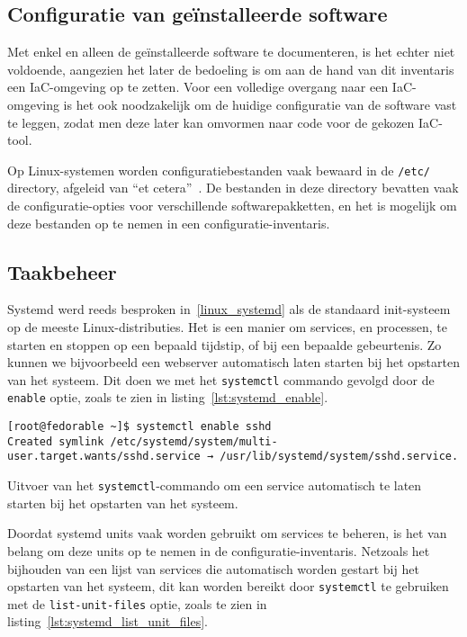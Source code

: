 \subsection{Configuratie van ge{\"i}nstalleerde software}
\label{risico_software_configuratie}

Met enkel en alleen de ge\"installeerde software te documenteren, is het echter niet voldoende, aangezien het later de bedoeling is om aan de hand van dit inventaris een IaC-omgeving op te zetten.
Voor een volledige overgang naar een IaC-omgeving is het ook noodzakelijk om de huidige configuratie van de software vast te leggen, zodat men deze later kan omvormen naar code voor de gekozen IaC-tool.

Op Linux-systemen worden configuratiebestanden vaak bewaard in de \texttt{/etc/} directory, afgeleid van ``et cetera''~\autocite{linuxfoundation-filesystem}.
De bestanden in deze directory bevatten vaak de configuratie-opties voor verschillende softwarepakketten, en het is mogelijk om deze bestanden op te nemen in een configuratie-inventaris.

\subsection{Taakbeheer}
\label{risico_taakbeheer}

Systemd werd reeds besproken in~\ref{linux_systemd} als de standaard init-systeem op de meeste Linux-distributies.
Het is een manier om services, en processen, te starten en stoppen op een bepaald tijdstip, of bij een bepaalde gebeurtenis.
Zo kunnen we bijvoorbeeld een webserver automatisch laten starten bij het opstarten van het systeem.
Dit doen we met het \texttt{systemctl} commando gevolgd door de \texttt{enable} optie, zoals te zien in listing~\ref{lst:systemd_enable}.

\begin{listing}
  \begin{verbatim}
[root@fedorable ~]$ systemctl enable sshd
Created symlink /etc/systemd/system/multi-user.target.wants/sshd.service → /usr/lib/systemd/system/sshd.service.
  \end{verbatim}
  \caption[Automatische service start met systemctl.]{Uitvoer van het \texttt{systemctl}-commando om een service automatisch te laten starten bij het opstarten van het systeem.}
  \label{lst:systemd_enable}
\end{listing}

Doordat systemd units vaak worden gebruikt om services te beheren, is het van belang om deze units op te nemen in de configuratie-inventaris.
Netzoals het bijhouden van een lijst van services die automatisch worden gestart bij het opstarten van het systeem, dit kan worden bereikt door \texttt{systemctl} te gebruiken met de \texttt{list-unit-files} optie, zoals te zien in listing~\ref{lst:systemd_list_unit_files}.

